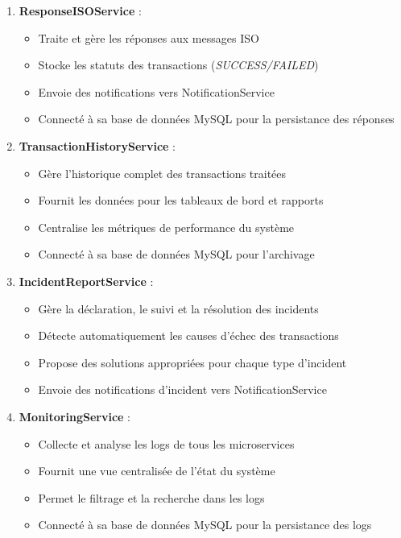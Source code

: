 \begin{enumerate}[label=\alph*)]
    \item \textbf{ResponseISOService} :
    \begin{itemize}[label=\textbullet]
        \item Traite et gère les réponses aux messages ISO
        \item Stocke les statuts des transactions (\textit{SUCCESS/FAILED})
        \item Envoie des notifications vers NotificationService
        \item Connecté à sa base de données MySQL pour la persistance des réponses
    \end{itemize}

    \item \textbf{TransactionHistoryService} :
    \begin{itemize}[label=\textbullet]
        \item Gère l'historique complet des transactions traitées
        \item Fournit les données pour les tableaux de bord et rapports
        \item Centralise les métriques de performance du système
        \item Connecté à sa base de données MySQL pour l'archivage
    \end{itemize}

    \item \textbf{IncidentReportService} :
    \begin{itemize}[label=\textbullet]
        \item Gère la déclaration, le suivi et la résolution des incidents
        \item Détecte automatiquement les causes d'échec des transactions
        \item Propose des solutions appropriées pour chaque type d'incident
        \item Envoie des notifications d'incident vers NotificationService
    \end{itemize}

    \item \textbf{MonitoringService} :
    \begin{itemize}[label=\textbullet]
        \item Collecte et analyse les logs de tous les microservices
        \item Fournit une vue centralisée de l'état du système
        \item Permet le filtrage et la recherche dans les logs
        \item Connecté à sa base de données MySQL pour la persistance des logs
    \end{itemize}


\end{enumerate}
